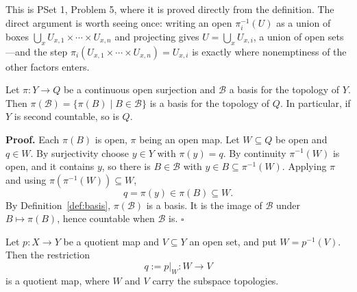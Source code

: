 \documentclass[11pt]{report}
\makeatletter
\newcounter{thmcounter}[section]
\renewenvironment{proof}[1][Proof]{\noindent\textbf{#1.} }{\hfill$\square$\par\vspace{5pt}}
\newcommand{\thmlabel}[1]{\edef\@currentlabel{\arabic{section}.\arabic{thmcounter}}\label{#1}}
\newcommand{\leeref}[1]{\par\smallskip{\raggedleft\footnotesize\textsc{Lee}:\ #1\par}}
\makeatother
\begin{document}
\begin{rembox}\label{rem:new-spaces-4}
This is PSet 1, Problem 5, where it is proved directly from the definition. The direct argument is worth seeing once: writing an open $\pi_i^{-1}(U)$ as a union of boxes $\bigcup_x U_{x,1} \times \cdots \times U_{x,n}$ and projecting gives $U = \bigcup_x U_{x,i}$, a union of open sets---and the step $\pi_i(U_{x,1} \times \cdots \times U_{x,n}) = U_{x,i}$ is exactly where nonemptiness of the other factors enters.
\end{rembox}

\begin{lembox}\thmlabel{lem:open-surj-basis}
Let $\pi : Y \to Q$ be a continuous open surjection and $\mathcal{B}$ a basis for the topology of $Y$. Then $\pi(\mathcal{B}) = \{\pi(B) \mid B \in \mathcal{B}\}$ is a basis for the topology of $Q$. In particular, if $Y$ is second countable, so is $Q$.
\end{lembox}

\begin{proof}
Each $\pi(B)$ is open, $\pi$ being an open map. Let $W \subseteq Q$ be open and $q \in W$. By surjectivity choose $y \in Y$ with $\pi(y) = q$. By continuity $\pi^{-1}(W)$ is open, and it contains $y$, so there is $B \in \mathcal{B}$ with $y \in B \subseteq \pi^{-1}(W)$. Applying $\pi$ and using $\pi(\pi^{-1}(W)) \subseteq W$,
\[
q = \pi(y) \in \pi(B) \subseteq W .
\]
By Definition~\ref{def:basis}, $\pi(\mathcal{B})$ is a basis. It is the image of $\mathcal{B}$ under $B \mapsto \pi(B)$, hence countable when $\mathcal{B}$ is.
\end{proof}

\begin{lembox}\thmlabel{lem:quotient-restrict}
Let $p : X \to Y$ be a quotient map and $V \subseteq Y$ an open set, and put $W = p^{-1}(V)$. Then the restriction
\[
q := p|_W : W \longrightarrow V
\]
is a quotient map, where $W$ and $V$ carry the subspace topologies.
\leeref{Theorem A.27(e)}
\end{lembox}

\begin{center}
\end{center}
\end{document}
